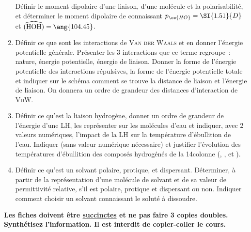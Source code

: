 \documentclass[a4paper, 12pt, final, garamond]{book}
\begin{document}
\begin{enumerate}[label=\sqenumi]
        Définir le moment dipolaire d'une liaison, d'une molécule et la
        polarisabilité, et déterminer le moment dipolaire de 
        connaissant $p_{\ce{HO}} = \SI{1.51}{D}$ et $\widehat{({\rm HOH})} =
        \ang{104.45}$.
    \item Définir ce que sont les interactions de \textsc{Van der Waals} et en
        donner l'énergie potentielle générale. Présenter les 3 interactions que
        ce terme regroupe~: nature, énergie potentielle, énergie de liaison.
        Donner la forme de l'énergie potentielle des interactions répulsives, la
        forme de l'énergie potentielle totale et indiquer sur le schéma comment
        se trouve la distance de liaison et l'énergie de liaison. On donnera un
        ordre de grandeur des distances d'interaction de \textsc{VdW}.
    \item Définir ce qu'est la liaison hydrogène, donner un ordre de grandeur de
        l'énergie d'une LH, les représenter sur les molécules d'eau et indiquer,
        avec 2 valeurs numériques, l'impact de la LH sur la température
        d'ébullition de l'eau. Indiquer (sans valeur numérique nécessaire) et
        justifier l'évolution des températures d'ébullition des composés
        hydrogénés de la 14\ieme colonne (, ,  et
        ).
    \item Définir ce qu'est un solvant polaire, protique, et dispersant.
        Déterminer, à partir de la représentation d'une molécule de solvant et
        de sa valeur de permittivité relative, s'il est polaire, protique et
        dispersant ou non. Indiquer comment choisir un solvant connaissant le
        soluté à dissoudre.
\end{enumerate}
\vspace{-5pt}
\begin{framed}
    \centering\bfseries\large
    Les fiches doivent être \ul{succinctes} et ne pas faire 3 copies doubles.
    Synthétisez l'information. Il est interdit de copier-coller le cours.
\end{framed}
\end{document}
